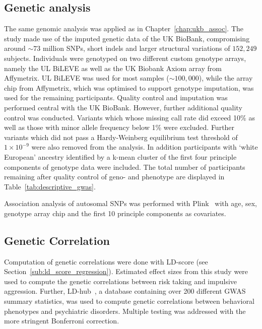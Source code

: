 \subsection{Genetic analysis}
\label{sub:genetic_analysis}

The same genomic analysis was applied as in Chapter~\ref{chap:ukb_assoc}.
The study made use of the imputed genetic data of the UK BioBank, compromising around $\sim73$ million SNPs, short indels and larger structural variations of $152,249$ subjects.
Individuals were genotyped on two different custom genotype arrays, namely the UL BiLEVE as well as the UK Biobank Axiom array from Affymetrix. 
UL BiLEVE was used for most samples ($\sim100,000$), while the array chip from Affymetrix, which was optimised to support genotype imputation, was used for the remaining participants. 
Quality control and imputation was performed central with the UK BioBank.
However, further additional quality control was conducted.
Variants which whose missing call rate did exceed 10\% as well as those with minor allele frequency below 1\% were excluded.
Further variants which did not pass a Hardy-Weinberg equilibrium test threshold of $1\times10^{-9}$ were also removed from the analysis.
In addition participants with `white European' ancestry identified by a k-mean cluster of the first four principle components of genotype data were included.
The total number of participants remaining after quality control of geno- and phenotype are displayed in Table~\ref{tab:descriptive_gwas}.

Association analysis of autosomal SNPs was performed with Plink~\cite{Purcell2007,Chang2015} with age, sex, genotype array chip and the first 10 principle components as covariates.

\subsection{Genetic Correlation}
\label{sub:genetic_correlation}

Computation of genetic correlations were done with LD-score (see Section~\ref{sub:ld_score_regression}).
Estimated effect sizes from this study were used to compute the genetic correlations between risk taking and impulsive aggression.
Further, LD-hub~\cite{ZHENG2016}, a database containing over 200 different GWAS summary statistics, was used to compute genetic correlations between behavioral phenotypes and psychiatric disorders.
Multiple testing was addressed with the more stringent Bonferroni correction.

